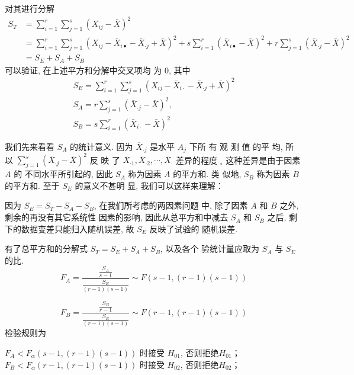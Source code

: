 对其进行分解
$$
\begin{aligned}
    S_{T}&=\sum_{i=1}^{r} \sum_{j=1}^{s}\left(X_{i j}-\bar{X}\right)^{2}\\ 
    &=\sum_{i=1}^{r} \sum_{j=1}^{s}\left(X_{i j}-\bar{X}_{i \bullet}-\bar{X}_{\cdot j}+\bar{X}\right)^{2}+s \sum_{i=1}^{r}\left(\bar{X}_{i \bullet}-\bar{X}\right)^{2}+r \sum_{j=1}^{s}\left(\bar{X}_{\cdot j}-\bar{X}\right)^{2} \\
    &=S_{E}+S_{A}+S_{B}
\end{aligned}
$$
可以验证, 在上述平方和分解中交叉项均
为 0, 其中
$$
\begin{array}{c}
S_{E}=\sum_{i=1}^{r} \sum_{j=1}^{s}\left(X_{i j}-\bar{X}_{i \cdot}-\bar{X}_{\cdot j}+\bar{X}\right)^{2} \\
S_{A}=r \sum_{j=1}^{s}\left(\bar{X}_{\cdot j}-\bar{X}\right)^{2}, \\
S_{B}= s \sum_{i=1}^{r}\left(\bar{X}_{i \cdot}-\bar{X}\right)^{2}
\end{array}
$$

我们先来看看 \( {S}_{A} \) 的统计意义. 因为 \( \overline{{X}}_{{\cdot} j} \) 是水平 \( {A}_{j} \) 下所
有 观 测 值 的平 均,  所 以 \( \sum_{j=1}^{s}\left(\bar{X}_{\cdot j}-\bar{X}\right)^{2} \) 反 映 了
\( \overline{{X}}_{{\cdot 1}}, \overline{{X}}_{\cdot 2}, \cdots, \overline{{X}}_{{\cdot}} \) 差异的程度 \( _{\circ} \) 这种差异是由于因素 \( {A} \) 的
不同水平所引起的, 因此 \( S_{A} \) 称为因素 \( A \) 的平方和. 类
似地,  \( {S}_{B} \) 称为因素 \( {B} \) 的平方和. 至于 \( {S}_{E} \) 的意义不甚明
显, 我们可以这样来理解：

因为 \( S_{E}=S_{T}-S_{A}-S_{B} \), 在我们所考虑的两因素问题 中, 除了因素 \( {A} \) 和 \( {B} \) 之外, 剩余的再没有其它系统性 因素的影响, 因此从总平方和中减去 \( {S}_{A} \) 和 \( {S}_{B} \) 之后, 剩 下的数据变差只能归入随机误差, 故 \( S_{E} \) 反映了试验的 随机误差. 

有了总平方和的分解式 \( S_{T}=S_{E}+S_{A}+S_{B} \), 以及各个
验统计量应取为 \( {S}_{A} \) 与 \( {S}_{E} \) 的比. 
$$
F_{A}=\frac{\frac{S_{A}}{s-1}}{\frac{S_{E}}{(r-1)(s-1)}} \sim F(s-1,(r-1)(s-1))
$$

$$
F_{B}=\frac{\frac{{S}_{B}}{{r}-{1}}}{\frac{{S}_{E}}{({r}-{1})(s-{1})}} \sim {F}({r}-{1},({r}-{1})({s}-{1}))
$$
检验规则为

\( F_{A}<F_{\alpha}(s-1,(r-1)(s-1)) \) 时接受 \( H_{01} \), 否则拒绝\( H_{01} \)；
\( F_{B}<F_{\alpha}(r-1,(r-1)(s-1)) \) 时接受 \( H_{02} \), 否则拒绝\( H_{02} \)；

